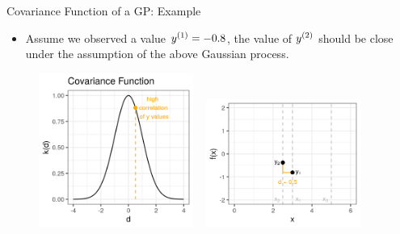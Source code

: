 \begin{vbframe}{Covariance Function of a GP: Example} 

\begin{itemize}
  \item Assume we observed a value $\yi[1] = - 0.8$, the value of $\yi[2]$ should be close under the assumption of the above Gaussian process. 
\end{itemize}

\begin{figure}
  \includegraphics[width=0.45\textwidth]{figure_man/covariance2point/example_covariance_1.png} ~      \includegraphics[width=0.45\textwidth]{figure_man/covariance2point/example_function_1-2.png}
\end{figure}

\end{vbframe}


